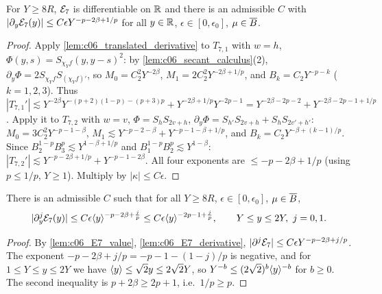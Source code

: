 \begin{lemma}[Derivative of $\mc E_7$]
  \label{lem:c06_E7_derivative}
  For $Y\ge8R$, $\mc E_7$ is differentiable on $\mathbb{R}$ and there is an admissible $C$ with
  $|\partial_y\mathcal{E}_7(y)|\le C\epsilon Y^{-p-2\beta+1/p}$ for all $y\in\mathbb{R}$, $\epsilon\in[0,\epsilon_0]$, $\mu\in\overline{B}$.
\end{lemma}
\begin{proof}
  Apply \cref{lem:c06_translated_derivative} to $T_{7,1}$ with $w=h$, $\Phi(y,s)=S_{\chi_Yf}(y,y-s)^2$: by
  \cref{lem:c06_secant_calculus}(2), $\partial_y\Phi=2S_{\chi_Yf}S_{(\chi_Yf)'}$, so
  $M_0=C_2^2Y^{-2\beta}$, $M_1=2C_2^2Y^{-2\beta+1/p}$, and $B_k=C_2Y^{-p-k}$ ($k=1,2,3$). Thus
  $|T_{7,1}'|\lesssim Y^{-2\beta}Y^{-(p+2)(1-p)-(p+3)p}+Y^{-2\beta+1/p}Y^{-2p-1}=Y^{-2\beta-2p-2}+Y^{-2\beta-2p-1+1/p}$.
  Apply it to $T_{7,2}$ with $w=v$, $\Phi=S_hS_{2v+h}$, $\partial_y\Phi=S_{h'}S_{2v+h}+S_hS_{2v'+h'}$:
  $M_0=3C_2^2Y^{-p-1-\beta}$, $M_1\lesssim Y^{-p-2-\beta}+Y^{-p-1-\beta+1/p}$, and $B_k=C_2Y^{-\beta+(k-1)/p}$.
  Since $B_2^{1-p}B_3^p\lesssim Y^{1-\beta+1/p}$ and $B_1^{1-p}B_2^p\lesssim Y^{1-\beta}$:
  $|T_{7,2}'|\lesssim Y^{-p-2\beta+1/p}+Y^{-p-1-2\beta}$.
  All four exponents are $\le -p-2\beta+1/p$ (using $p\le 1/p$, $Y\ge1$). Multiply by $|\kappa|\le C\epsilon$.
\end{proof}

\begin{lemma}[Control of $\mc E_7$]
  \label{lem:approx_E7}
  There is an admissible $C$ such that for all $Y\ge8R$, $\epsilon\in[0,\epsilon_0]$, $\mu\in\overline{B}$,
  \[|\partial_y^j\mathcal{E}_7(y)|\le C\epsilon\langle y \rangle^{-p-2\beta+\frac jp}\le C\epsilon\langle y \rangle^{-2p-1+\frac jp},\qquad Y\le y\le2Y,\ j=0,1.\]
\end{lemma}
\begin{proof}
  By \cref{lem:c06_E7_value}, \cref{lem:c06_E7_derivative}, $|\partial^j\mathcal{E}_7|\le C\epsilon Y^{-p-2\beta+j/p}$.
  The exponent $-p-2\beta+j/p=-p-1-(1-j)/p$ is negative, and for $1\le Y\le y\le2Y$ we have
  $\langle y \rangle\le\sqrt2y\le2\sqrt2Y$, so $Y^{-b}\le(2\sqrt2)^b\langle y \rangle^{-b}$ for $b\geq0$. The second inequality
  is $p+2\beta\ge2p+1$, i.e.\ $1/p\ge p$.
\end{proof}

